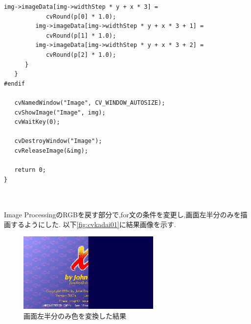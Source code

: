 \documentclass{jarticle}
\begin{document}
\begin{lstlisting}[caption = 画像を左半分のみ色を変換するプログラム,label=code:cvkadai01]
         img->imageData[img->widthStep * y + x * 3] =
            cvRound(p[0] * 1.0);
         img->imageData[img->widthStep * y + x * 3 + 1] =
            cvRound(p[1] * 1.0);
         img->imageData[img->widthStep * y + x * 3 + 2] =
            cvRound(p[2] * 1.0);
      }
   }
#endif

   cvNamedWindow("Image", CV_WINDOW_AUTOSIZE);
   cvShowImage("Image", img);
   cvWaitKey(0);

   cvDestroyWindow("Image");
   cvReleaseImage(&img);

   return 0;
}



\end{lstlisting}

Image ProcessingのRGBを戻す部分で,for文の条件を変更し,画面左半分のみを描画するようにした.
以下\ref{fig:cvkadai01}に結果画像を示す.

\begin{figure}[H]
\begin{center}
\includegraphics[width=7.0cm]{cv_kadai01/image.png}
\caption{画面左半分のみ色を変換した結果}
\label{fig:2-2-1kairo}
\end{center}
\end{figure}
\end{document}
